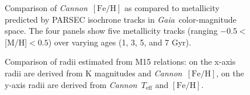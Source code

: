 \documentclass[modern]{aastex62}
\newcommand{\cannon}{\textsl{Cannon}}
\newcommand{\gaia}{\textsl{Gaia}}
\newcommand{\teff}{T_{\mathrm{eff}}}
\newcommand{\feh}{[{\mathrm{Fe}/\mathrm{H}}]}
\begin{document}
\begin{figure}[ht]
	\caption{Comparison of \cannon\ $\feh$ as compared to metallicity predicted by PARSEC isochrone tracks \citealt{Bressan:2012} in \gaia\ color-magnitude space. The four panels show five metallicity tracks (ranging $-0.5<$[M/H]$<0.5$) over varying ages (1, 3, 5, and 7 Gyr). \label{fig:isochrone_cmd}}
\end{figure}

\begin{figure}[ht]
	\caption{Comparison of radii estimated from M15 relations: on the x-axis radii are derived from  K magnitudes and \cannon\ $\feh$, on the y-axis radii are derived from \cannon\ $\teff$ and $\feh$. \label{fig:radii}}
\end{figure}


\end{document}
